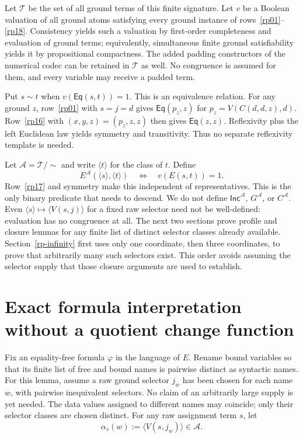 \documentclass[11pt]{article}
\newcommand{\Eq}{\mathsf{Eq}}
\newcommand{\Inc}{\mathsf{Inc}}
\newcommand{\cl}[1]{\langle#1\rangle}
\begin{document}
Let $\mathcal T$ be the set of all ground terms of this finite signature.
Let $v$ be a Boolean valuation of all ground atoms satisfying every
ground instance of rows~\ref{rp01}--\ref{rp18}. Consistency yields such
a valuation by first-order completeness and evaluation of ground terms;
equivalently, simultaneous finite ground satisfiability yields it by
propositional compactness. The added padding constructors of the numerical
codec can be retained in $\mathcal T$ as well. No congruence is assumed
for them, and every variable may receive a padded term.

Put $s\sim t$ when $v(\Eq(s,t))=1$. This is an equivalence relation.
For any ground $z$, row~\ref{rp01} with $s=j=d$ gives
$\Eq(p_z,z)$ for $p_z=V(C(d,d,z),d)$. Row~\ref{rp16} with
$(x,y,z)=(p_z,z,z)$ then gives $\Eq(z,z)$. Reflexivity plus the left
Euclidean law yields symmetry and transitivity. Thus no separate
reflexivity template is needed.

Let $\mathcal A=\mathcal T/{\sim}$ and write $\cl t$ for the class
of $t$. Define
\[
 E^{\mathcal A}(\cl s,\cl t)\quad\Longleftrightarrow\quad v(E(s,t))=1.
\]
Row~\ref{rp17} and symmetry make this independent of representatives.
This is the only binary predicate that needs to descend. We do not define
$\Inc^{\mathcal A}$, $G^{\mathcal A}$, or $C^{\mathcal A}$.
Even $\cl s\mapsto\cl{V(s,j)}$ for a fixed raw selector need not be
well-defined: evaluation has no congruence at all. The next two sections
prove profile and closure lemmas for any finite list of distinct selector
classes already available. Section~\ref{rp-infinity} first uses only
one coordinate, then three coordinates, to prove that arbitrarily many
such selectors exist. This order avoids assuming the selector supply
that those closure arguments are used to establish.

\section{Exact formula interpretation without a quotient change function}

Fix an equality-free formula $\varphi$ in the language of $E$. Rename
bound variables so that its finite list of free and bound names is
pairwise distinct as syntactic names. For this lemma, assume a raw ground
selector $j_w$ has been chosen for each name $w$, with pairwise
inequivalent selectors. No claim of an arbitrarily large supply is yet
needed. The data values
assigned to different names may coincide; only their selector classes
are chosen distinct. For any raw assignment term $s$, let
\[
 \alpha_s(w):=\cl{V(s,j_w)}\in\mathcal A.
\]
\end{document}
